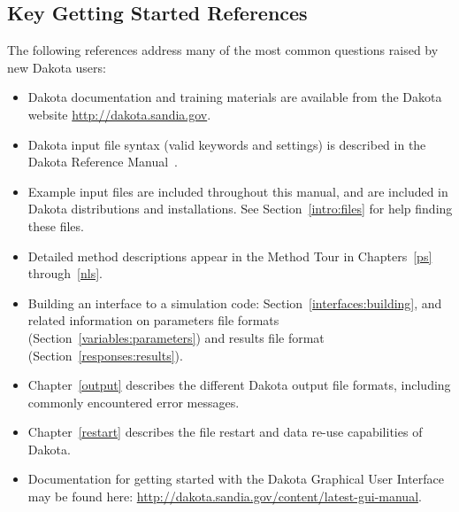  
\subsection{Key Getting Started References}\label{tutorial:keyrefs}

The following references address many of the most common questions
raised by new Dakota users:
\begin{itemize}
\item Dakota documentation and training materials are available from
  the Dakota website \url{http://dakota.sandia.gov}.

\item Dakota input file syntax (valid keywords and settings) is
  described in the Dakota Reference Manual~\cite{RefMan}.

\item Example input files are included throughout this manual, and
  are included in Dakota distributions and installations. See
  Section~\ref{intro:files} for help finding these files.

\item Detailed method descriptions appear in the Method Tour in
  Chapters~\ref{ps} through~\ref{nls}.

\item Building an interface to a simulation code:
  Section~\ref{interfaces:building}, and related information on parameters
  file formats (Section~\ref{variables:parameters}) and results file
  format (Section~\ref{responses:results}).

\item Chapter~\ref{output} describes the different Dakota output file
  formats, including commonly encountered error messages.

\item Chapter~\ref{restart} describes the file restart and data re-use
  capabilities of Dakota.

\item Documentation for getting started with the Dakota Graphical
User Interface  may be found here:  
\url{http://dakota.sandia.gov/content/latest-gui-manual}.

\end{itemize}
